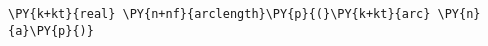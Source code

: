 \begin{Verbatim}[commandchars=\\\{\}]
    \PY{k+kt}{real} \PY{n+nf}{arclength}\PY{p}{(}\PY{k+kt}{arc} \PY{n}{a}\PY{p}{)}
\end{Verbatim}
